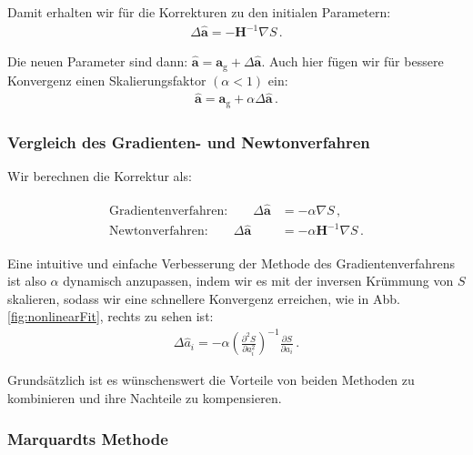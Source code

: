 Damit erhalten wir f\"ur die Korrekturen zu den initialen Parametern:
\begin{align}
\Delta \boldsymbol{\hat{a}} = -\boldsymbol{H}^{-1} \nabla S\,.
\label{eq:vl9-12}
\end{align}

Die neuen Parameter sind dann: $\boldsymbol{\hat{a}} = \boldsymbol{a}_\mathrm{g} + \Delta \boldsymbol{\hat{a}}$. Auch hier f\"ugen wir f\"ur bessere Konvergenz einen Skalierungsfaktor $(\alpha < 1)$ ein:
\begin{align}
\boldsymbol{\hat{a}} = \boldsymbol{a}_\mathrm{g} + \alpha \Delta \boldsymbol{\hat{a}}\,.
\label{eq:vl9-13}
\end{align}


\subsubsection{Vergleich des Gradienten- und Newtonverfahren}
\label{subsubsec:vl9-3}

Wir berechnen die Korrektur als:

\begin{align}
\begin{split}
\text{Gradientenverfahren:}\quad \quad \Delta \boldsymbol{\hat{a}} &= -\alpha \nabla S\,,\\
\text{Newtonverfahren:}\quad \quad \Delta \boldsymbol{\hat{a}} &= -\alpha \boldsymbol{H}^{-1} \nabla S\,.
\label{eq:vl9-14}
\end{split}
\end{align}

Eine intuitive und einfache Verbesserung der Methode des Gradientenverfahrens ist also $\alpha$ dynamisch anzupassen, indem wir es mit der inversen Kr\"ummung von $S$ skalieren, sodass wir eine schnellere Konvergenz erreichen, wie in Abb. \ref{fig:nonlinearFit}, rechts zu sehen ist:
\begin{align}
\Delta \hat{a}_i = -\alpha \left( \frac{ \partial^2 S }{ \partial a_i^2 } \right)^{-1} \frac{ \partial S }{ \partial a_i }\,.
\label{eq:vl9-15}
\end{align}

Grunds\"atzlich ist es w\"unschenswert die Vorteile von beiden Methoden zu kombinieren und ihre Nachteile zu kompensieren.


\subsubsection{Marquardts Methode}
\label{subsubsec:vl9-4}

